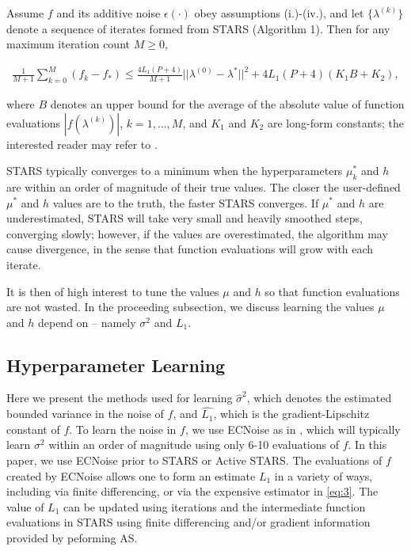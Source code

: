 \documentclass{amsart}
\begin{document}
Assume $f$ and its additive noise $\epsilon(\cdot)$ obey assumptions (i.)-(iv.), and let $\{\lambda^{(k)}\}$ denote a sequence of iterates formed from STARS (Algorithm 1). Then for any maximum iteration count $M \geq 0$,

\begin{eqnarray} \label{eq:12}
\frac{1}{M+1} \sum_{k=0}^M (f_k-f_*) \leq \frac{4L_1(P+4)}{M+1}||\lambda^{(0)}-\lambda^*||^2 + 4L_1(P+4)(K_1B +K_2),
\end{eqnarray} 


\noindent where $B$ denotes an upper bound for the average of the absolute value of function evaluations $|f(\lambda^{(k)})|$, $k=1,\ldots,M$, and $K_1$ and $K_2$ are long-form constants; the interested reader may refer to \cite{CW}.

STARS typically converges to a minimum when the hyperparameters $\mu_k^*$ and $h$ are within an order of magnitude of their true values. The closer the user-defined $\mu^*$ and $h$ values are to the truth, the faster STARS converges. If $\mu^*$ and $h$ are underestimated, STARS will take very small and heavily smoothed steps, converging slowly; however, if the values are overestimated, the algorithm may cause divergence, in the sense that function evaluations will grow with each iterate.

It is then of high interest to tune the values $\mu$ and $h$ so that function evaluations are not wasted. In the proceeding subsection, we discuss learning the values $\mu$ and $h$ depend on -- namely $\sigma^2$ and $L_1$.


\subsection{Hyperparameter Learning}

Here we present the methods used for learning $\hat{\sigma}^2$, which denotes the estimated bounded variance in the noise of $f$, and $\hat{L_1}$, which is the gradient-Lipschitz constant of $f$. To learn the noise in $f$, we use ECNoise as in \cite{MW}, which will typically learn $\sigma^2$ within an order of magnitude using only 6-10 evaluations of $f$. In this paper, we use ECNoise prior to STARS or Active STARS. The evaluations of $f$ created by ECNoise allows one to form an estimate $L_1$ in a variety of ways, including via finite differencing, or via the expensive estimator in \eqref{eq:3}. The value of $L_1$ can be updated using iterations and the intermediate function evaluations in STARS using finite differencing and/or gradient information provided by peforming AS.
\end{document}
